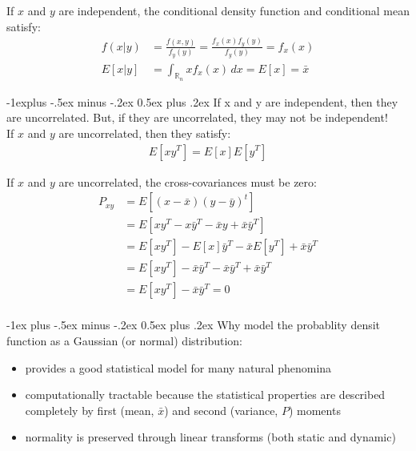 \documentclass[10pt,landscape]{article}
\makeatletter
\newcommand{\R}{\mathbb{R}}
\renewcommand{\section}{\@startsection{section}{1}{0mm}%
                                {-1ex plus -.5ex minus -.2ex}%
                                {0.5ex plus .2ex}%
                                {\normalfont\large\bfseries}}
\renewcommand{\subsection}{\@startsection{subsection}{2}{0mm}%
                                {-1explus -.5ex minus -.2ex}%
                                {0.5ex plus .2ex}%
                                {\normalfont\normalsize\bfseries}}
\makeatother
\begin{document}
\begin{multicols}{3}
If $x$ and $y$ are independent, the conditional density function and conditional mean satisfy:
\begin{align*}
f(x|y)&=\frac{f(x,y)}{f_y(y)}=\frac{f_x(x)f_y(y)}{f_y(y)}=f_x(x)\\
E[x|y]&=\int_{\R_{n}} xf_x(x)\,dx=E[x]=\bar{x}
\end{align*}

\subsection{\color{ForestGreen}{Correlation}}
If x and y are independent, then they are uncorrelated. But, if they are uncorrelated, they may not be independent!\\
If $x$ and $y$ are uncorrelated, then they satisfy:
\begin{align*}
E[xy^T]=E[x]E[y^T]
\end{align*}

If $x$ and $y$ are uncorrelated, the cross-covariances must be zero:
\begin{align*}
P_{xy}&=E[(x-\bar{x})(y-\bar{y})^t]\\
&=E[xy^T-x\bar{y}^T-\bar{x}y+\bar{x}\bar{y}^T]\\
&=E[xy^T]-E[x]\bar{y}^T-\bar{x}E[y^T]+\bar{x}\bar{y}^T\\
&=E[xy^T]-\bar{x}\bar{y}^T-\bar{x}\bar{y}^T+\bar{x}\bar{y}^T\\
&=E[xy^T]-\bar{x}\bar{y}^T=0\\
\end{align*}

\section{\color{blue}{Gaussian Distribution}}
Why model the probablity densit function as a Gaussian (or normal) distribution:
\begin{itemize}
\item provides a good statistical model for many natural phenomina
\item computationally tractable because the statistical properties are described completely by first (mean, $\bar{x}$) and second (variance, $P$) moments 
\item normality is preserved through linear transforms (both static and dynamic)
\end{itemize} 


\end{multicols}
\end{document}
